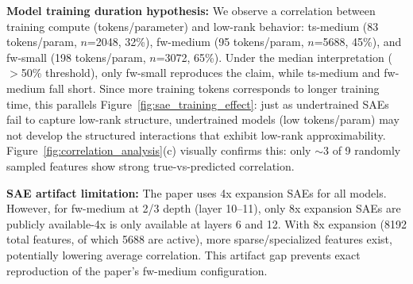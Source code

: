 \textbf{Model training duration hypothesis:} We observe a correlation between training compute (tokens/parameter) and low-rank behavior: ts-medium (83 tokens/param, $n$=2048, 32\%), fw-medium (95 tokens/param, $n$=5688, 45\%), and fw-small (198 tokens/param, $n$=3072, 65\%).
Under the median interpretation ($>$50\% threshold), only fw-small reproduces the claim, while ts-medium and fw-medium fall short.
Since more training tokens corresponds to longer training time, this parallels Figure~\ref{fig:sae_training_effect}: just as undertrained SAEs fail to capture low-rank structure, undertrained models (low tokens/param) may not develop the structured interactions that exhibit low-rank approximability.
Figure~\ref{fig:correlation_analysis}(c) visually confirms this: only $\sim$3 of 9 randomly sampled features show strong true-vs-predicted correlation.

\textbf{SAE artifact limitation:} The paper uses 4x expansion SAEs for all models.
However, for fw-medium at 2/3 depth (layer 10--11), only 8x expansion SAEs are publicly available-4x is only available at layers 6 and 12.
With 8x expansion (8192 total features, of which 5688 are active), more sparse/specialized features exist, potentially lowering average correlation.
This artifact gap prevents exact reproduction of the paper's fw-medium configuration.
